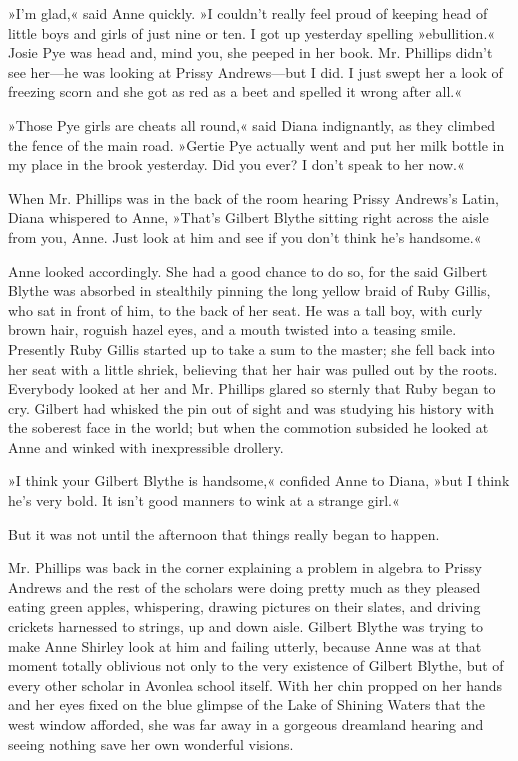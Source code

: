 »I'm glad,« said Anne quickly. »I couldn't really feel proud of keeping head of little boys and girls of just nine or ten. I got up yesterday spelling »ebullition.« Josie Pye was head and, mind you, she peeped in her book. Mr. Phillips didn't see her—he was looking at Prissy Andrews—but I did. I just swept her a look of freezing scorn and she got as red as a beet and spelled it wrong after all.«

»Those Pye girls are cheats all round,« said Diana indignantly, as they climbed the fence of the main road. »Gertie Pye actually went and put her milk bottle in my place in the brook yesterday. Did you ever? I don't speak to her now.«

When Mr. Phillips was in the back of the room hearing Prissy Andrews's Latin, Diana whispered to Anne, »That's Gilbert Blythe sitting right across the aisle from you, Anne. Just look at him and see if you don't think he's handsome.«

Anne looked accordingly. She had a good chance to do so, for the said Gilbert Blythe was absorbed in stealthily pinning the long yellow braid of Ruby Gillis, who sat in front of him, to the back of her seat. He was a tall boy, with curly brown hair, roguish hazel eyes, and a mouth twisted into a teasing smile. Presently Ruby Gillis started up to take a sum to the master; she fell back into her seat with a little shriek, believing that her hair was pulled out by the roots. Everybody looked at her and Mr. Phillips glared so sternly that Ruby began to cry. Gilbert had whisked the pin out of sight and was studying his history with the soberest face in the world; but when the commotion subsided he looked at Anne and winked with inexpressible drollery.

»I think your Gilbert Blythe is handsome,« confided Anne to Diana, »but I think he's very bold. It isn't good manners to wink at a strange girl.«

But it was not until the afternoon that things really began to happen.

Mr. Phillips was back in the corner explaining a problem in algebra to Prissy Andrews and the rest of the scholars were doing pretty much as they pleased eating green apples, whispering, drawing pictures on their slates, and driving crickets harnessed to strings, up and down aisle. Gilbert Blythe was trying to make Anne Shirley look at him and failing utterly, because Anne was at that moment totally oblivious not only to the very existence of Gilbert Blythe, but of every other scholar in Avonlea school itself. With her chin propped on her hands and her eyes fixed on the blue glimpse of the Lake of Shining Waters that the west window afforded, she was far away in a gorgeous dreamland hearing and seeing nothing save her own wonderful visions.

